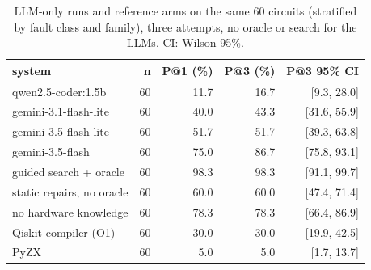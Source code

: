 \begin{table}[t]
\centering
\caption{LLM-only runs and reference arms on the same 60 circuits (stratified by fault class and family), three attempts, no oracle or search for the LLMs. CI: Wilson 95\%.}
\label{tab:llm}
\footnotesize
\setlength{\tabcolsep}{3pt}
\begin{tabular}{lrrrr}
\toprule
system & n & P@1 (\%) & P@3 (\%) & P@3 95\% CI \\
\midrule
qwen2.5-coder:1.5b & 60 & 11.7 & 16.7 & [9.3, 28.0] \\
gemini-3.1-flash-lite & 60 & 40.0 & 43.3 & [31.6, 55.9] \\
gemini-3.5-flash-lite & 60 & 51.7 & 51.7 & [39.3, 63.8] \\
gemini-3.5-flash & 60 & 75.0 & 86.7 & [75.8, 93.1] \\
guided search + oracle & 60 & 98.3 & 98.3 & [91.1, 99.7] \\
static repairs, no oracle & 60 & 60.0 & 60.0 & [47.4, 71.4] \\
no hardware knowledge & 60 & 78.3 & 78.3 & [66.4, 86.9] \\
Qiskit compiler (O1) & 60 & 30.0 & 30.0 & [19.9, 42.5] \\
PyZX & 60 & 5.0 & 5.0 & [1.7, 13.7] \\
\bottomrule
\end{tabular}
\end{table}
